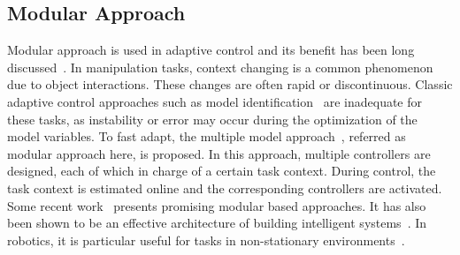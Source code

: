 \subsection{Modular Approach}


Modular approach is used in adaptive control and its benefit has been long discussed~\citep{jacobs1991adaptive,narendra1997adaptive}.
In manipulation tasks, context changing is a common phenomenon due to object interactions. These changes are often rapid or discontinuous. Classic adaptive control approaches such as model identification~\citep{khalil2004modeling} are inadequate for these tasks, as instability or error may occur during the optimization of the model variables. To fast adapt, the multiple model approach~\citep{narendra1995adaptation}, referred as modular approach here, is proposed. In this approach, multiple controllers are designed, each of which in charge of a certain task context. During control, the task context is estimated online and the corresponding controllers are activated. Some recent work~\citep{fekri2007robust,kuipers2010multiple} presents promising modular based approaches. It has also been shown to be an effective architecture of building intelligent systems~\citep{bryson2004modular}. In robotics, it is particular useful for tasks in non-stationary environments~\citep{sugimoto2012emosaic}.



